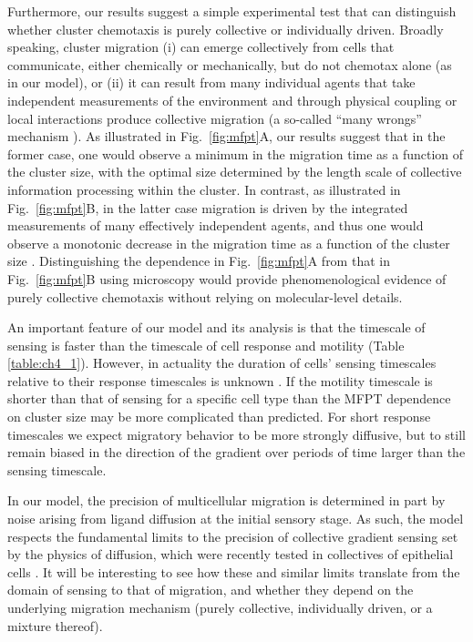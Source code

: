 Furthermore, our results suggest a simple experimental test that can distinguish whether cluster chemotaxis is purely collective or individually driven. Broadly speaking, cluster migration (i) can emerge collectively from cells that communicate, either chemically or mechanically, but do not chemotax alone (as in our model), or (ii) it can result from many individual agents that take independent measurements of the environment and through physical coupling or local interactions produce collective migration \cite{coburn2013tactile,vicsek1995novel} (a so-called ``many wrongs'' mechanism \cite{simons2004many}). As illustrated in Fig.\ \ref{fig:mfpt}A, our results suggest that in the former case, one would observe a minimum in the migration time as a function of the cluster size, with the optimal size determined by the length scale of collective information processing within the cluster. In contrast, as illustrated in Fig.\ \ref{fig:mfpt}B, in the latter case migration is driven by the integrated measurements of many effectively independent agents, and thus one would observe a monotonic decrease in the migration time as a function of the cluster size \cite{simons2004many}. Distinguishing the dependence in Fig.\ \ref{fig:mfpt}A from that in Fig.\ \ref{fig:mfpt}B using microscopy would provide phenomenological evidence of purely collective chemotaxis without relying on molecular-level details.

An important feature of our model and its analysis is that the timescale of sensing is faster than the timescale of cell response and motility (Table \ref{table:ch4_1}). However, in actuality the duration of cells' sensing timescales relative to their response timescales is unknown \cite{ellison2016cell}. If the motility timescale is shorter than that of sensing for a specific cell type than the MFPT dependence on cluster size may be more complicated than predicted. For short response timescales we expect migratory behavior to be more strongly diffusive, but to still remain biased in the direction of the gradient over periods of time larger than the sensing timescale.

In our model, the precision of multicellular migration is determined in part by noise arising from ligand diffusion at the initial sensory stage. As such, the model respects the fundamental limits to the precision of collective gradient sensing set by the physics of diffusion, which were recently tested in collectives of epithelial cells \cite{ellison2016cell, mugler2016limits}. It will be interesting to see how these and similar limits translate from the domain of sensing to that of migration, and whether they depend on the underlying migration mechanism (purely collective, individually driven, or a mixture thereof).
